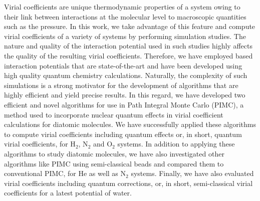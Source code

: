 Virial coefficients are unique thermodynamic properties of a system owing to their link between interactions at the molecular level to macroscopic quantities such as the pressure. In this work, we take advantage of this feature and compute virial coefficients of a variety of systems by performing simulation studies. The nature and quality of the interaction potential used in such studies highly affects the quality of the resulting virial coefficients. Therefore, we have employed \abinitio{} based interaction potentials that are state-of-the-art and have been developed using high quality quantum chemistry calculations. Naturally, the complexity of such simulations is a strong motivator for the development of algorithms that are highly efficient and yield precise results. In this regard, we have developed two efficient and novel algorithms for use in Path Integral Monte Carlo (PIMC), a method used to incorporate nuclear quantum effects in virial coefficient calculations for diatomic molecules. We have successfully applied these algorithms to compute virial coefficients including quantum effects or, in short, quantum virial coefficients, for H$_2$, N$_2$ and O$_2$ systems. In addition to applying these algorithms to study diatomic molecules, we have also investigated other algorithms like PIMC using semi-classical beads and compared them to conventional PIMC, for He as well as N$_2$ systems. Finally, we have also evaluated virial coefficients including quantum corrections, or, in short, semi-classical virial coefficients for a latest \abinitio{} potential of water.
